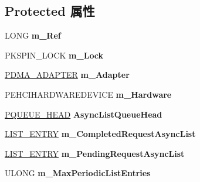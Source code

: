 \subsection*{Protected 属性}
\begin{DoxyCompactItemize}
\item 
\mbox{\label{class_c_u_s_b_queue_a98d207da68904cf42ebecd222026d04d}} 
L\+O\+NG {\bfseries m\+\_\+\+Ref}
\item 
\mbox{\label{class_c_u_s_b_queue_a06702ec769795ce186117304ff47054b}} 
P\+K\+S\+P\+I\+N\+\_\+\+L\+O\+CK {\bfseries m\+\_\+\+Lock}
\item 
\mbox{\label{class_c_u_s_b_queue_a6cfd7347b8f76718c5e1b91e38d48b41}} 
\hyperlink{struct___d_m_a___a_d_a_p_t_e_r}{P\+D\+M\+A\+\_\+\+A\+D\+A\+P\+T\+ER} {\bfseries m\+\_\+\+Adapter}
\item 
\mbox{\label{class_c_u_s_b_queue_ad66c5868847d915b424169b2020d9af8}} 
P\+E\+H\+C\+I\+H\+A\+R\+D\+W\+A\+R\+E\+D\+E\+V\+I\+CE {\bfseries m\+\_\+\+Hardware}
\item 
\mbox{\label{class_c_u_s_b_queue_a752bb728a36e6093928e4f8d40b0e889}} 
\hyperlink{struct___q_u_e_u_e___h_e_a_d}{P\+Q\+U\+E\+U\+E\+\_\+\+H\+E\+AD} {\bfseries Async\+List\+Queue\+Head}
\item 
\mbox{\label{class_c_u_s_b_queue_a0e60ab142676e7d4794c5f5e1838ec9f}} 
\hyperlink{struct___l_i_s_t___e_n_t_r_y}{L\+I\+S\+T\+\_\+\+E\+N\+T\+RY} {\bfseries m\+\_\+\+Completed\+Request\+Async\+List}
\item 
\mbox{\label{class_c_u_s_b_queue_aeb56b8917c7f03e0c11239d05de6514f}} 
\hyperlink{struct___l_i_s_t___e_n_t_r_y}{L\+I\+S\+T\+\_\+\+E\+N\+T\+RY} {\bfseries m\+\_\+\+Pending\+Request\+Async\+List}
\item 
\mbox{\label{class_c_u_s_b_queue_a395eec509367c47d69c388a747e2df44}} 
U\+L\+O\+NG {\bfseries m\+\_\+\+Max\+Periodic\+List\+Entries}
\item 
\mbox{\label{class_c_u_s_b_queue_a7655d11a928e2781e4a259cc9ea91c62}} 

\end{DoxyCompactItemize}
